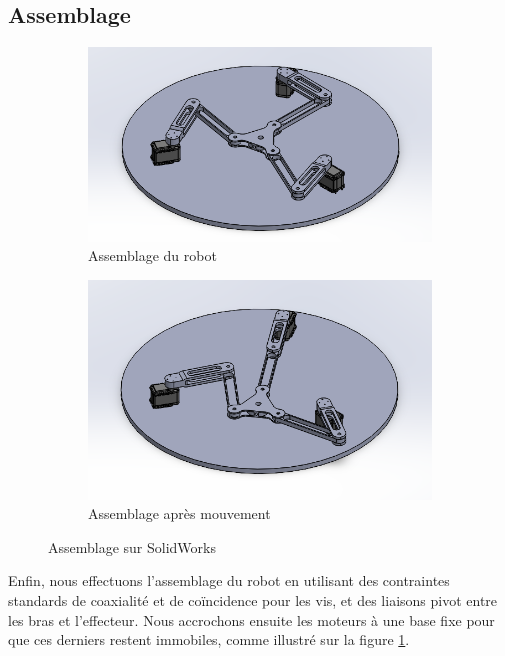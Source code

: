 \documentclass[a4paper, 11pt]{report}
\begin{document}
\subsection{Assemblage}

\begin{figure}[!tbh]
    \centering
    \begin{subfigure}[t]{0.48\textwidth}
        \centering
        \includegraphics[width=\textwidth]{Figures/assemblage_1.png}
        \caption{Assemblage du robot}
    \end{subfigure}
    \hfill
    \begin{subfigure}[t]{0.48\textwidth}
        \centering
        \includegraphics[width=\textwidth]{Figures/assemblage_2.png}
        \caption{Assemblage après mouvement}
    \end{subfigure}
    \caption{Assemblage sur SolidWorks}
    \label{fig:assemblage}
\end{figure}

Enfin, nous effectuons l'assemblage du robot en utilisant des contraintes standards de coaxialité et de coïncidence pour les vis, et des liaisons pivot entre les bras et l'effecteur. Nous accrochons ensuite les moteurs à une base fixe pour que ces derniers restent immobiles, comme illustré sur la figure \ref{fig:assemblage}.
\end{document}
